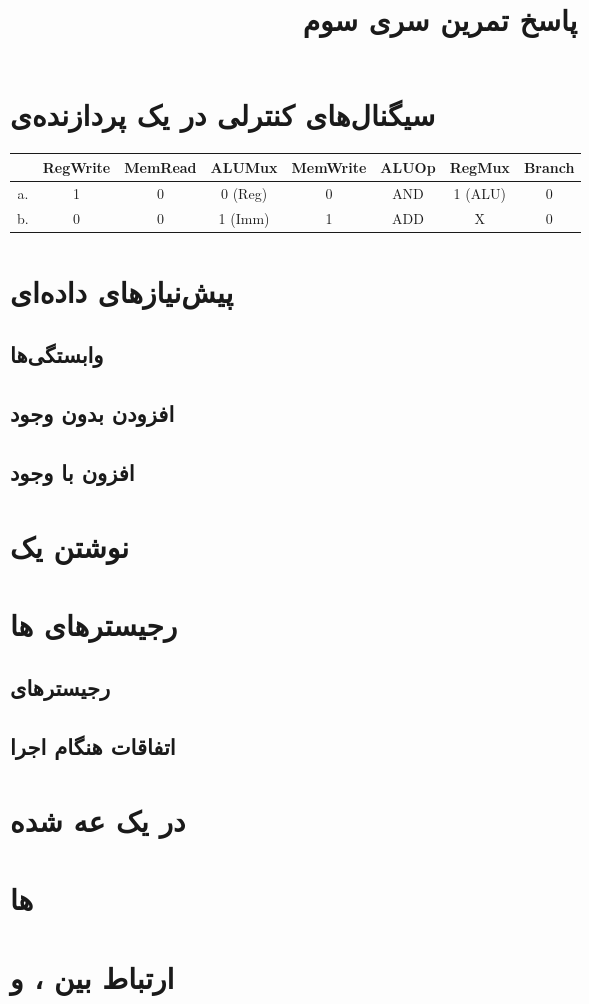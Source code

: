 \documentclass[11pt, dvipsnames, svgnames, x11names]{article}
\title{پاسخ تمرین سری سوم}
\date{}
\begin{document}
\maketitle
\tableofcontents
\newpage
\section{سیگنال‌های کنترلی در یک پردازنده‌ی }
\begin{latin}
\begin{table}[H]
\begin{adjustbox}{width=\textwidth}
\begin{tabular}{|c|c|c|c|c|c|c|c|}
\hline
&
RegWrite &
MemRead&
ALUMux&
MemWrite&
ALUOp&
RegMux&
Branch\\
\hline
\hline
a. &
1 &
0 &
0 (Reg)&
0 &
AND &
1 (ALU)&
0 \\
\hline
b. &
0 &
0 &
1 (Imm)&
1 &
ADD &
X &
0 \\
\hline
\end{tabular}
\end{adjustbox}
\end{table}
\end{latin}
\section{پیش‌نیاز‌‌های داده‌ای}
\subsection{وابستگی‌ها}
\subsection{افزودن  بدون وجود }
\subsection{افزون  با وجود }
\section{نوشتن یک }
\section{رجیستر‌های ها}
\subsection{رجیستر‌های }
\subsection{اتفاقات هنگام اجرا}
\section{ در یک  عه  شده}
\section{ها}
\section{ارتباط بین ،  و }
\end{document}
